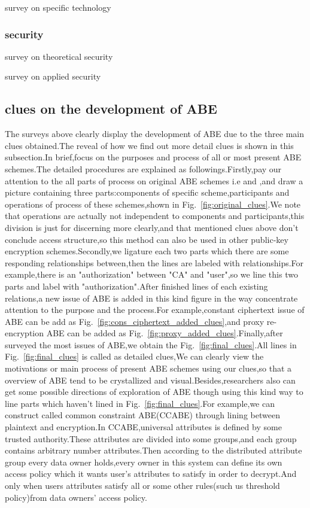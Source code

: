survey on specific technology
\subsubsection{security}
survey on theoretical security

survey on applied security
\subsection{clues on the development of ABE}
The surveys above clearly display the development of ABE due to the three main clues obtained.The reveal of how we find out more detail clues is shown in this subsection.In brief,focus on the purposes and process of all or most present ABE schemes.The detailed procedures are explained as followings.Firstly,pay our attention to the all parts of process on original ABE schemes i.e\cite{classical:KP-ABE} and \cite{first:CP-ABE},and draw a picture containing three parts:components of specific scheme,participants and operations of process of these schemes,shown in Fig.~\ref{fig:original_clues}.We note that operations are actually not independent to components and participants,this division is just for discerning more clearly,and that mentioned clues above don't conclude access structure,so this method can also be used in other public-key encryption schemes.Secondly,we ligature each two parts which there are some responding relationships between,then the lines are labeled with relationships.For example,there is an "authorization" between "CA" and "user",so we line this two parts and label with "authorization".After finished lines of each existing relations,a new issue of ABE is added in this kind figure in the way concentrate attention to the purpose and the process.For example,constant ciphertext issue of ABE can be add as Fig.~\ref{fig:cons_ciphertext_added_clues},and proxy re-encryption ABE can be added as Fig.~\ref{fig:proxy_added_clues}.Finally,after surveyed the most issues of ABE,we obtain the Fig.~\ref{fig:final_clues}.All lines in Fig.~\ref{fig:final_clues} is called as detailed clues,We can clearly view the motivations or main process of present ABE schemes using our clues,so that a overview of ABE tend to be crystallized and visual.Besides,researchers also can get some possible directions of exploration of ABE though using this kind way to line parts which haven't lined in Fig.~\ref{fig:final_clues}.For example,we can construct called common constraint ABE(CCABE) through lining between plaintext and encryption.In CCABE,universal attributes is defined by some trusted authority.These attributes are divided into some groups,and each group contains arbitrary number attributes.Then according to the distributed attribute group every data owner holds,every owner in this system can define its own access policy which it wants user's attributes to satisfy in order to decrypt.And only when users attributes satisfy all or some other rules(such us threshold policy)from data owners' access policy.
